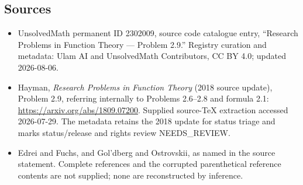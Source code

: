 \documentclass[11pt]{article}
\begin{document}
\subsection{Sources}
\begin{itemize}
\item UnsolvedMath permanent ID 2302009, source code catalogue entry, ``Research Problems in Function Theory --- Problem 2.9.'' Registry curation and metadata: Ulam AI and UnsolvedMath Contributors, CC BY 4.0; updated 2026-08-06.
\item Hayman, \emph{Research Problems in Function Theory} (2018 source update), Problem 2.9, referring internally to Problems 2.6--2.8 and formula 2.1: \url{https://arxiv.org/abs/1809.07200}. Supplied source-TeX extraction accessed 2026-07-29. The metadata retains the 2018 update for status triage and marks status/release and rights review NEEDS\_REVIEW.
\item Edrei and Fuchs, and Gol'dberg and Ostrovskii, as named in the source statement. Complete references and the corrupted parenthetical reference contents are not supplied; none are reconstructed by inference.
\end{itemize}
\end{document}
